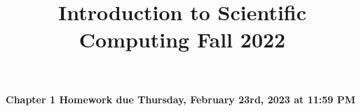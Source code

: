 \documentclass[a4paper,12pt,answers,addpoints]{exam}
\title{Introduction to Scientific Computing  \textbf{Fall 2022}}
\author{}
\begin{document}
	\begin{center}
		\textbf{Chapter 1 Homework due Thursday, February 23rd, 2023 at 11:59 PM}\\
	\end{center}
	
	
\end{document}
